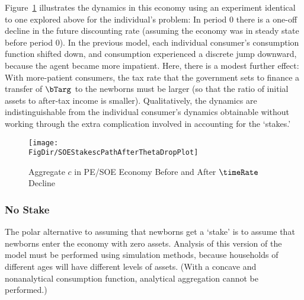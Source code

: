 \documentclass{\handout}
\begin{document}
Figure~\ref{fig:SOEStakescPathAfterThetaDropPlot} illustrates the
dynamics in this economy using an experiment identical to one explored
above for the individual's problem: In period 0 there is a one-off
decline in the future discounting rate (assuming the economy was in
steady state before period 0).  In the previous model, each individual
consumer's consumption function shifted down, and consumption
experienced a discrete jump downward, because the agent became more
impatient.  Here, there is a modest further effect: With
more-patient consumers, the tax rate that the government sets to finance a transfer
of $\bTarg^{\null}$ to the newborns must be larger (so that the ratio of initial assets to
after-tax income is smaller).  Qualitatively, the
dynamics are indistinguishable from the individual consumer's dynamics
obtainable without working through the extra complication involved in
accounting for the `stakes.'

\begin{figure}
\caption{Aggregate $c$ in PE/SOE Economy Before and After $\timeRate$ Decline}
\texttt{[image: \\FigDir/SOEStakescPathAfterThetaDropPlot]}
\label{fig:SOEStakescPathAfterThetaDropPlot}
\end{figure}

\subsubsection{No Stake}

The polar alternative to assuming that newborns get a `stake' is to
assume that newborns enter the economy with zero assets.  Analysis of
this version of the model must be performed using simulation methods,
because households of different ages will have different levels of
assets.  (With a concave and nonanalytical consumption function,
analytical aggregation cannot be performed.)
\end{document}
